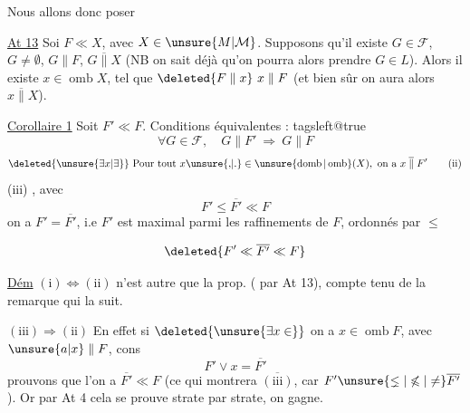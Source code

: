 Nous allons donc poser

\uline{At 13} \quad Soi $F\ll X$, avec $X\in\unsure{M|\mathcal M}$.
 Supposons qu'il existe $G\in\mathcal F$, $G\neq\emptyset$, $G\parallel F$, $G\mathrel{\overline{\parallel}}X$ (NB on  sait déjà qu'on pourra alors prendre $G\in L$). Alors il existe $x\in\operatorname{omb} X$, tel que $\deleted{F\parallel x}\ x\parallel F$ (et bien sûr on aura alors $x\mathrel{\overline{\parallel}}X$).

\uline{Corollaire 1} \quad Soit $F'\ll F$. Conditions équivalentes :
\begingroup\csname tagsleft@true\endcsname
\[
\forall G\in\mathcal F,\quad G\parallel F'\ \Longrightarrow\ G\parallel F
\tag*{(i)}
\]
\[
\deleted{\unsure{\exists x|\exists}} \ \text{Pour tout }x\unsure{{,}|{.}}\in\unsure{\operatorname{domb}|\operatorname{omb}}(X),\ \text{on a }x\mathrel{\overline{\parallel}}F'
\tag*{(ii)}
\]
\endgroup
{}
(iii)  , avec
\[
F'\leqslant\overline{F'}\ll F
\]
on a $F'=\overline{F'}$, i.e $F'$ est maximal parmi les raffinements de $F$, ordonnés par $\leqslant$

\[
\deleted{F'\ll\overline{F'}\ll F}
\]

\uline{Dém} \quad $\mathrm{(i)}\Longleftrightarrow\mathrm{(ii)}$ n'est autre que la prop. ( par At 13), compte tenu de la remarque qui la suit.


$\mathrm{(iii)}\Longrightarrow\mathrm{(ii)}$   En effet si $\deleted{\unsure{\exists x\in}}$ on a $x\in\operatorname{omb} F$, avec $\unsure{a|x}\parallel F$, cons
\[
F'\vee x=\overline{F'}
\]
prouvons que l'on a $\overline{F'}\ll F$ (ce qui montrera $\overline{\mathrm{(iii)}}$, car $F'\unsure{\lneq|\not\leqslant|\neq}\overline{F'}$). Or  par At 4 cela se prouve strate par strate, on gagne.

